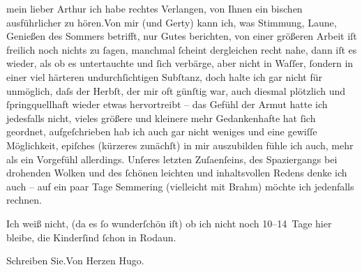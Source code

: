 \pstart{}mein lieber Arthur\pend\vspace{0.5em}
\pstart
           ich habe rechtes Verlangen, von Ihnen ein bischen ausführlicher zu hören.\hspace*{1.5em}Von mir (und Gerty) kann ich, was Stimmung, Laune, Genießen des Sommers betrifft, nur
               Gutes berichten, von einer größeren Arbeit iſt freilich noch nichts zu{ }ſagen,
               manchmal {\pb}ſcheint dergleichen
               recht nahe, dann iſt es wieder, als ob es untertauchte und{ }ſich verbärge, aber nicht
               in Waſſer,{ }ſondern in einer viel härteren undurchſichtigen Subſtanz, doch halte ich
               gar nicht für unmöglich, daſs der Herbſt, der mir oft günſtig war, auch diesmal
               plötzlich und{ }ſpringquellhaft wieder etwas {\pb}hervortreibt – das Gefühl der
               Armut hatte ich jedesfalls nicht, vieles größere und kleinere mehr Gedankenhafte hat{ }ſich geordnet, aufgeſchrieben hab ich auch gar nicht weniges und eine gewiſſe
               Möglichkeit, epiſches (kürzeres zunächſt) in mir auszubilden fühle ich auch, mehr als
               ein Vorgefühl {\pb}allerdings. Unſeres
               letzten Zuſa{\geminationm}enſeins, des Spaziergangs bei drohenden
               Wolken und des{ }ſchönen leichten und inhaltsvollen Redens denke ich auch – auf ein
               paar Tage Semmering (vielleicht mit Brahm) möchte ich jedenfalls rechnen.\pend
           
\pstart
           Ich weiß nicht, (da es{ }ſo wunderſchön iſt) ob ich nicht noch 10–14 Tage hier bleibe,
               die Kinderſind{ }ſchon in Rodaun.\pend
           
\pstart
           Schreiben Sie.\hspace*{1.5em}Von Herzen\pend
           \pstart \spacefill\mbox{Hugo.}\pend{}\endnumbering{}  \newcommand{\dateiname}{L01624}\newcommand{\titel}{Hugo von Hofmannsthal an Arthur Schnitzler, 4. [9. 1906]}\newcommand{\editorInnen}{Martin Anton Müller und Gerd-Hermann Susen}
